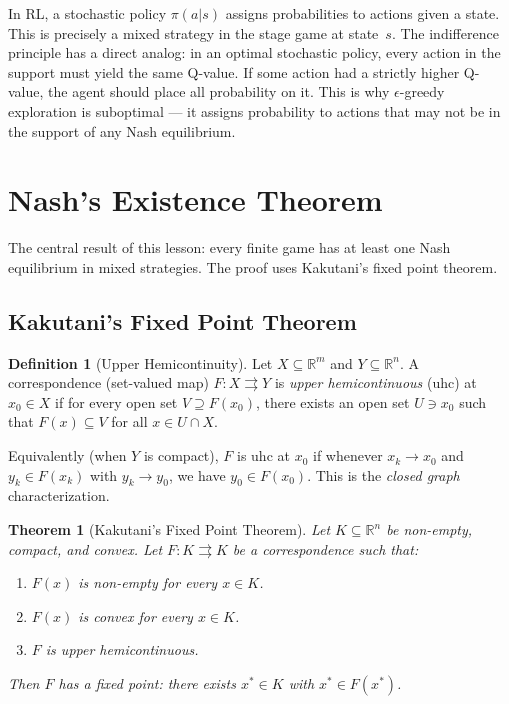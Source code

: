 \documentclass[11pt,a4paper]{article}
\theoremstyle{definition}
\newtheorem{definition}{Definition}[section]
\theoremstyle{plain}
\newtheorem{theorem}{Theorem}[section]
\theoremstyle{remark}
\newcommand{\R}{\mathbb{R}}
\begin{document}
\begin{rlconnection}
In RL, a stochastic policy $\pi(a|s)$ assigns probabilities to actions given a state.
This is precisely a mixed strategy in the stage game at state~$s$. The indifference
principle has a direct analog: in an optimal stochastic policy, every action in the
support must yield the same Q-value. If some action had a strictly higher Q-value,
the agent should place all probability on it. This is why $\epsilon$-greedy exploration
is suboptimal --- it assigns probability to actions that may not be in the support of
any Nash equilibrium.
\end{rlconnection}

\section{Nash's Existence Theorem}
\label{sec:nash_existence}

The central result of this lesson: every finite game has at least one Nash equilibrium
in mixed strategies. The proof uses Kakutani's fixed point theorem.

\subsection{Kakutani's Fixed Point Theorem}
\label{subsec:kakutani}

\begin{definition}[Upper Hemicontinuity]
\label{def:uhc}
Let $X \subseteq \R^m$ and $Y \subseteq \R^n$. A correspondence (set-valued map)
$F : X \rightrightarrows Y$ is \emph{upper hemicontinuous} (uhc) at $x_0 \in X$ if
for every open set $V \supseteq F(x_0)$, there exists an open set $U \ni x_0$ such
that $F(x) \subseteq V$ for all $x \in U \cap X$.

Equivalently (when $Y$ is compact), $F$ is uhc at $x_0$ if whenever $x_k \to x_0$
and $y_k \in F(x_k)$ with $y_k \to y_0$, we have $y_0 \in F(x_0)$. This is the
\emph{closed graph} characterization.
\end{definition}

\begin{theorem}[Kakutani's Fixed Point Theorem]
\label{thm:kakutani}
Let $K \subseteq \R^n$ be non-empty, compact, and convex. Let $F : K \rightrightarrows K$
be a correspondence such that:
\begin{enumerate}[nosep,label=(\roman*)]
    \item $F(x)$ is non-empty for every $x \in K$.
    \item $F(x)$ is convex for every $x \in K$.
    \item $F$ is upper hemicontinuous.
\end{enumerate}
Then $F$ has a fixed point: there exists $x^* \in K$ with $x^* \in F(x^*)$.
\end{theorem}
\end{document}
